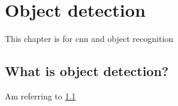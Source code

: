 \chapter{Object detection}
\label{chap:object_detection}

This chapter is for cnn and object recognition

\section{What is object detection?}
\label{sec:obj_det_question}

Am referring to \ref{sec:obj_det_question}